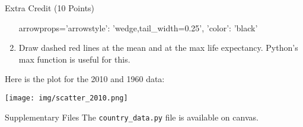 \documentclass[11pt]{cselabheader}
\begin{document}
\begin{infobox}{Extra Credit (10 Points)}
\begin{enumerate}
\begin{python3code}
arrowprops={'arrowstyle': 'wedge,tail_width=0.25', 'color': 'black'}
\end{python3code}

\item Draw dashed red lines at the mean and at the max life expectancy.
Python's max function is useful for this.
\end{enumerate}

Here is the plot for the 2010 and 1960 data:

\begin{center}
\texttt{[image: img/scatter\_2010.png]}
\end{center}
\end{infobox}

\begin{infobox}{Supplementary Files}
The \texttt{country\_data.py} file is available on canvas.
\end{infobox}


\printindex


\end{document}
